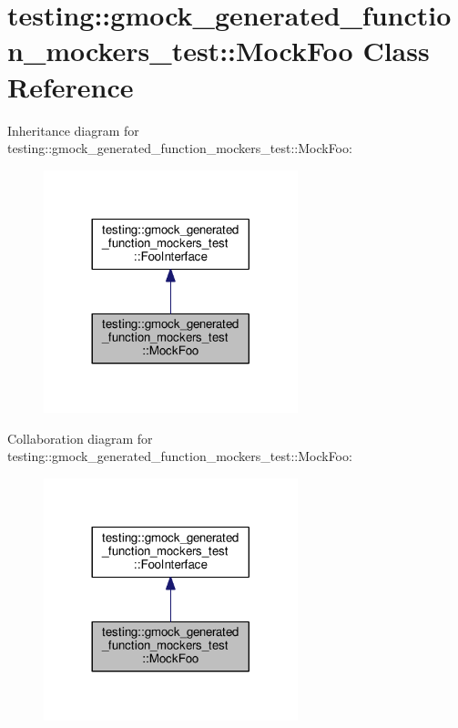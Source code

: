 \hypertarget{classtesting_1_1gmock__generated__function__mockers__test_1_1MockFoo}{}\section{testing\+:\+:gmock\+\_\+generated\+\_\+function\+\_\+mockers\+\_\+test\+:\+:Mock\+Foo Class Reference}
\label{classtesting_1_1gmock__generated__function__mockers__test_1_1MockFoo}


Inheritance diagram for testing\+:\+:gmock\+\_\+generated\+\_\+function\+\_\+mockers\+\_\+test\+:\+:Mock\+Foo\+:\nopagebreak
\begin{figure}[H]
\begin{center}
\leavevmode
\includegraphics[width=209pt]{classtesting_1_1gmock__generated__function__mockers__test_1_1MockFoo__inherit__graph}
\end{center}
\end{figure}


Collaboration diagram for testing\+:\+:gmock\+\_\+generated\+\_\+function\+\_\+mockers\+\_\+test\+:\+:Mock\+Foo\+:\nopagebreak
\begin{figure}[H]
\begin{center}
\leavevmode
\includegraphics[width=209pt]{classtesting_1_1gmock__generated__function__mockers__test_1_1MockFoo__coll__graph}
\end{center}
\end{figure}
